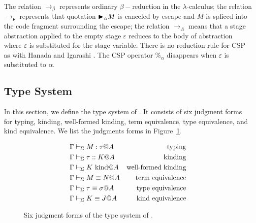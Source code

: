 The relation $\longrightarrow_\beta$ represents ordinary $\beta-$reduction in the \(\lambda\)-calculus; the relation
$\longrightarrow_\blacklozenge$ represents that quotation ${\mathop{\blacktriangleright}}_\alpha M$ is canceled by escape and $M$ is spliced into the code fragment surrounding the escape;
the relation $\longrightarrow_\Lambda$ means that a stage abstraction applied to the empty stage $\varepsilon$ reduces to the body of abstraction
where $\varepsilon$ is substituted for the stage variable.
There is no reduction rule for CSP as with Hanada and Igarashi \cite{Hanada2014}.
The CSP operator $\%_\alpha$ disappears when $\varepsilon$ is substituted to $\alpha$.


\subsection{Type System}


In this section, we define the type system of \LMD.
It consists of six judgment forms for typing, kinding, well-formed kinding, term equivalence, type equivalence, and kind equivalence.
We list the judgments forms in Figure~\ref{fig:LMD-six-judgments}.

\begin{figure}
	\begin{center}
		\begin{align*}
			\Gamma & \vdash_\Sigma M : \tau @ A       & \text{typing}              \\
			\Gamma & \vdash_\Sigma \tau :: K @ A      & \text{kinding}             \\
			\Gamma & \vdash_\Sigma K \text{\ kind} @ A      & \text{well-formed kinding} \\
			\Gamma & \vdash_\Sigma M \equiv N @ A         & \text{term equivalence}    \\
			\Gamma & \vdash_\Sigma \tau \equiv \sigma @ A & \text{type equivalence}    \\
			\Gamma & \vdash_\Sigma K \equiv J @ A         & \text{kind equivalence}
		\end{align*}
		\caption{Six judgment forms of the type system of \LMD.}
		\label{fig:LMD-six-judgments}
	\end{center}
\end{figure}

